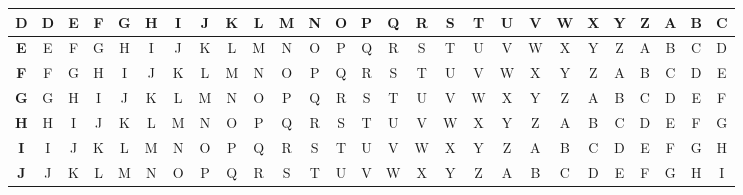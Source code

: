 \begin{table}[H]
{\begin{tabular}{c|c|c|c|c|c|c|c|c|c|c|c|c|c|c|c|c|c|c|c|c|c|c|c|c|c|c|}
            \hline
            \textbf{D} & D          & E          & F          & G          & H          & I          & J          & K          & L          & M          & N          & O          & P          & Q          & R          & S          & T          & U          & V          & W          & X          & Y          & Z          & A          & B          & C          \\[-1ex]
            \hline
            \textbf{E} & E          & F          & G          & H          & I          & J          & K          & L          & M          & N          & O          & P          & Q          & R          & S          & T          & U          & V          & W          & X          & Y          & Z          & A          & B          & C          & D          \\[-1ex]
            \hline
            \textbf{F} & F          & G          & H          & I          & J          & K          & L          & M          & N          & O          & P          & Q          & R          & S          & T          & U          & V          & W          & X          & Y          & Z          & A          & B          & C          & D          & E          \\[-1ex]
            \hline
            \textbf{G} & G          & H          & I          & J          & K          & L          & M          & N          & O          & P          & Q          & R          & S          & T          & U          & V          & W          & X          & Y          & Z          & A          & B          & C          & D          & E          & F          \\[-1ex]
            \hline
            \textbf{H} & H          & I          & J          & K          & L          & M          & N          & O          & P          & Q          & R          & S          & T          & U          & V          & W          & X          & Y          & Z          & A          & B          & C          & D          & E          & F          & G          \\[-1ex]
            \hline
            \textbf{I} & I          & J          & K          & L          & M          & N          & O          & P          & Q          & R          & S          & T          & U          & V          & W          & X          & Y          & Z          & A          & B          & C          & D          & E          & F          & G          & H          \\[-1ex]
            \hline
            \textbf{J} & J          & K          & L          & M          & N          & O          & P          & Q          & R          & S          & T          & U          & V          & W          & X          & Y          & Z          & A          & B          & C          & D          & E          & F          & G          & H          & I          \\[-1ex]

\end{tabular}}
\end{table}
